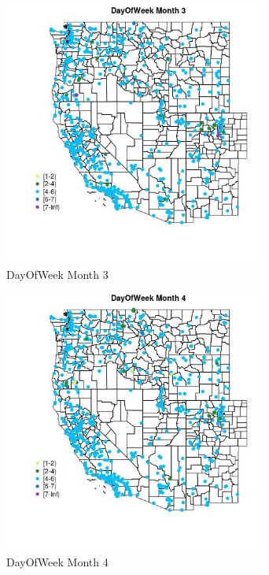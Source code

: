 \begin{figure} 
\centering  
\includegraphics[width=0.77\textwidth]{Code_Outputs/Report_ML_input_PM25_Step4_part_e_de_duplicated_aveswNAs_MapObsMo3DayOfWeek.jpg} 
\caption{\label{fig:Report_ML_input_PM25_Step4_part_e_de_duplicated_aveswNAsMapObsMo3DayOfWeek}DayOfWeek Month 3} 
\end{figure} 
 

\clearpage 

\begin{figure} 
\centering  
\includegraphics[width=0.77\textwidth]{Code_Outputs/Report_ML_input_PM25_Step4_part_e_de_duplicated_aveswNAs_MapObsMo4DayOfWeek.jpg} 
\caption{\label{fig:Report_ML_input_PM25_Step4_part_e_de_duplicated_aveswNAsMapObsMo4DayOfWeek}DayOfWeek Month 4} 
\end{figure} 
 

